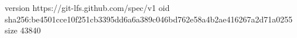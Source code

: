 version https://git-lfs.github.com/spec/v1
oid sha256:be4501cce10f251cb3395dd6a6a389c046bd762e58a4b2ae416267a2d71a0255
size 43840
